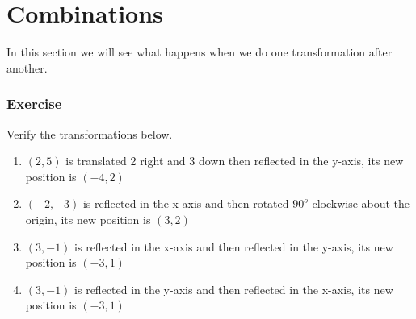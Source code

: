 \section{Combinations}
In this section we will see what happens when we do one transformation after another.
\subsubsection{Exercise}
Verify the transformations below.
\begin{enumerate}
	\item $(2, 5)$ is translated 2 right and 3 down then reflected in the y-axis, its new position is $(-4, 2)$
	\item $(-2, -3)$ is reflected in the x-axis and then rotated $90^o$ clockwise about the origin, its new position is $(3, 2)$
	\item $(3, -1)$ is reflected in the x-axis and then reflected in the y-axis, its new position is $(-3, 1)$
	\item $(3, -1)$ is reflected in the y-axis and then reflected in the x-axis, its new position is $(-3, 1)$
\end{enumerate}
